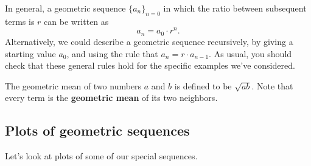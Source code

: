 \documentclass{ximera}
\begin{document}
In general, a geometric sequence $\{a_n\}_{n=0}$ in which the ratio between
subsequent terms is $r$ can be written as
\[
a_n = a_0 \cdot r^{n}.
\]
Alternatively, we could describe a geometric sequence
recursively, by giving a starting value $a_0$, and using the rule that
$a_{n} = r \cdot a_{n-1}$.  As usual, you should check that these general 
rules hold for the specific examples we've considered.

\begin{remark}
The geometric mean of two numbers $a$ and $b$ is defined to be
$\sqrt{ab}$. Note that every term is the \textbf{geometric mean} of its two neighbors.   

\end{remark}
%


\subsection*{Plots of geometric sequences}

Let's look at plots of some of our special sequences.   
\end{document}
